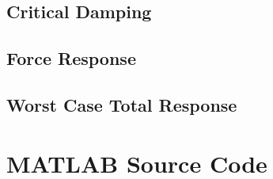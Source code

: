 \documentclass[12pt]{article}
\begin{document}
\subsection{Critical Damping}


\subsection{Force Response}
\subsection{Worst Case Total Response}

\pagebreak
\appendix
\section{MATLAB Source Code}
\label{app:code}

\end{document}
